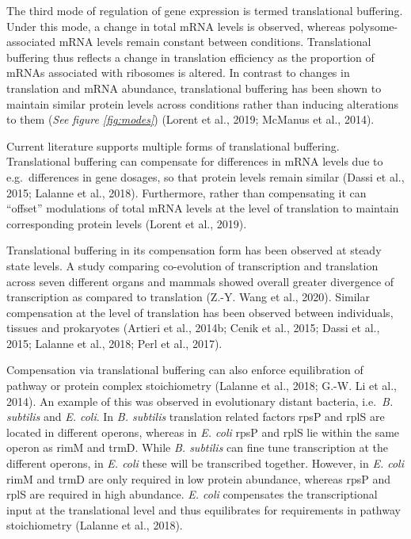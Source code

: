 \documentclass[
  12pt,
  openany]{book}
\begin{document}
The third mode of regulation of gene expression is termed translational buffering. Under this mode, a change in total mRNA levels is observed, whereas polysome-associated mRNA levels remain constant between conditions. Translational buffering thus reflects a change in translation efficiency as the proportion of mRNAs associated with ribosomes is altered. In contrast to changes in translation and mRNA abundance, translational buffering has been shown to maintain similar protein levels across conditions rather than inducing alterations to them (\emph{See figure \ref{fig:modes}}) (Lorent et al., 2019; McManus et al., 2014).

Current literature supports multiple forms of translational buffering. Translational buffering can compensate for differences in mRNA levels due to e.g.~differences in gene dosages, so that protein levels remain similar (Dassi et al., 2015; Lalanne et al., 2018). Furthermore, rather than compensating it can ``offset'' modulations of total mRNA levels at the level of translation to maintain corresponding protein levels (Lorent et al., 2019).

Translational buffering in its compensation form has been observed at steady state levels. A study comparing co-evolution of transcription and translation across seven different organs and mammals showed overall greater divergence of transcription as compared to translation (Z.-Y. Wang et al., 2020). Similar compensation at the level of translation has been observed between individuals, tissues and prokaryotes (Artieri et al., 2014b; Cenik et al., 2015; Dassi et al., 2015; Lalanne et al., 2018; Perl et al., 2017).

Compensation via translational buffering can also enforce equilibration of pathway or protein complex stoichiometry (Lalanne et al., 2018; G.-W. Li et al., 2014). An example of this was observed in evolutionary distant bacteria, i.e.~\emph{B. subtilis} and \emph{E. coli}. In \emph{B. subtilis} translation related factors rpsP and rplS are located in different operons, whereas in \emph{E. coli} rpsP and rplS lie within the same operon as rimM and trmD. While \emph{B. subtilis} can fine tune transcription at the different operons, in \emph{E. coli} these will be transcribed together. However, in \emph{E. coli} rimM and trmD are only required in low protein abundance, whereas rpsP and rplS are required in high abundance. \emph{E. coli} compensates the transcriptional input at the translational level and thus equilibrates for requirements in pathway stoichiometry (Lalanne et al., 2018).
\end{document}
